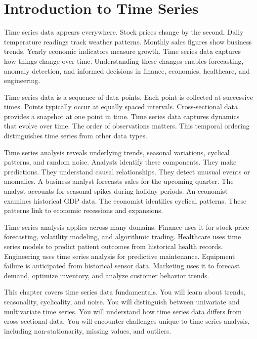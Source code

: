 \chapter{Introduction to Time Series}



Time series data appears everywhere. Stock prices change by the second. Daily temperature readings track weather patterns. Monthly sales figures show business trends. Yearly economic indicators measure growth. Time series data captures how things change over time. Understanding these changes enables forecasting, anomaly detection, and informed decisions in finance, economics, healthcare, and engineering.

Time series data is a sequence of data points. Each point is collected at successive times. Points typically occur at equally spaced intervals. Cross-sectional data provides a snapshot at one point in time. Time series data captures dynamics that evolve over time. The order of observations matters. This temporal ordering distinguishes time series from other data types.

Time series analysis reveals underlying trends, seasonal variations, cyclical patterns, and random noise. Analysts identify these components. They make predictions. They understand causal relationships. They detect unusual events or anomalies. A business analyst forecasts sales for the upcoming quarter. The analyst accounts for seasonal spikes during holiday periods. An economist examines historical GDP data. The economist identifies cyclical patterns. These patterns link to economic recessions and expansions.

Time series analysis applies across many domains. Finance uses it for stock price forecasting, volatility modeling, and algorithmic trading. Healthcare uses time series models to predict patient outcomes from historical health records. Engineering uses time series analysis for predictive maintenance. Equipment failure is anticipated from historical sensor data. Marketing uses it to forecast demand, optimize inventory, and analyze customer behavior trends.

This chapter covers time series data fundamentals. You will learn about trends, seasonality, cyclicality, and noise. You will distinguish between univariate and multivariate time series. You will understand how time series data differs from cross-sectional data. You will encounter challenges unique to time series analysis, including non-stationarity, missing values, and outliers.

